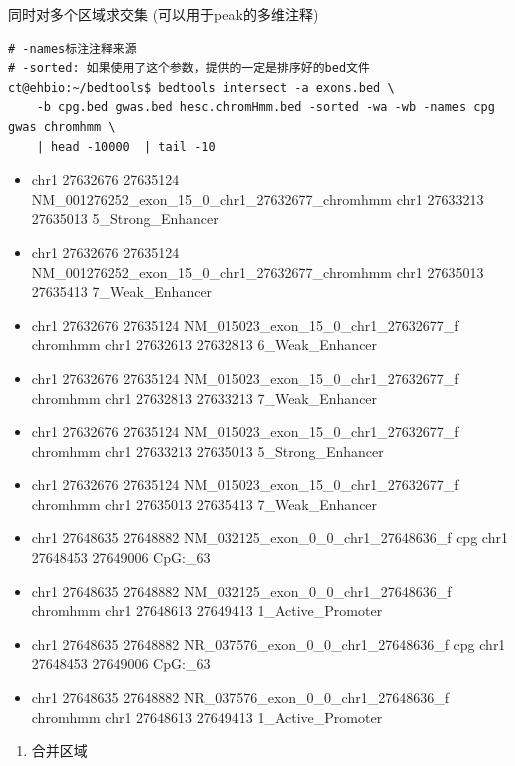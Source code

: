 \documentclass[]{article}
\providecommand{\tightlist}{%
  \setlength{\itemsep}{0pt}\setlength{\parskip}{0pt}}
\numberwithin{figure}{section}
\numberwithin{table}{section}
\begin{document}
同时对多个区域求交集 (可以用于peak的多维注释)

\begin{verbatim}
# -names标注注释来源
# -sorted: 如果使用了这个参数，提供的一定是排序好的bed文件
ct@ehbio:~/bedtools$ bedtools intersect -a exons.bed \
	-b cpg.bed gwas.bed hesc.chromHmm.bed -sorted -wa -wb -names cpg gwas chromhmm \
  	| head -10000  | tail -10
\end{verbatim}

\begin{itemize}
\tightlist
\item
  chr1 27632676 27635124 NM\_001276252\_exon\_15\_0\_chr1\_27632677\_chromhmm chr1 27633213 27635013 5\_Strong\_Enhancer
\item
  chr1 27632676 27635124 NM\_001276252\_exon\_15\_0\_chr1\_27632677\_chromhmm chr1 27635013 27635413 7\_Weak\_Enhancer
\item
  chr1 27632676 27635124 NM\_015023\_exon\_15\_0\_chr1\_27632677\_f chromhmm chr1 27632613 27632813 6\_Weak\_Enhancer
\item
  chr1 27632676 27635124 NM\_015023\_exon\_15\_0\_chr1\_27632677\_f chromhmm chr1 27632813 27633213 7\_Weak\_Enhancer
\item
  chr1 27632676 27635124 NM\_015023\_exon\_15\_0\_chr1\_27632677\_f chromhmm chr1 27633213 27635013 5\_Strong\_Enhancer
\item
  chr1 27632676 27635124 NM\_015023\_exon\_15\_0\_chr1\_27632677\_f chromhmm chr1 27635013 27635413 7\_Weak\_Enhancer
\item
  chr1 27648635 27648882 NM\_032125\_exon\_0\_0\_chr1\_27648636\_f cpg chr1 27648453 27649006 CpG:\_63
\item
  chr1 27648635 27648882 NM\_032125\_exon\_0\_0\_chr1\_27648636\_f chromhmm chr1 27648613 27649413 1\_Active\_Promoter
\item
  chr1 27648635 27648882 NR\_037576\_exon\_0\_0\_chr1\_27648636\_f cpg chr1 27648453 27649006 CpG:\_63
\item
  chr1 27648635 27648882 NR\_037576\_exon\_0\_0\_chr1\_27648636\_f chromhmm chr1 27648613 27649413 1\_Active\_Promoter
\end{itemize}

\begin{enumerate}
\def\labelenumi{\arabic{enumi}.}
\setcounter{enumi}{3}
\tightlist
\item
  合并区域
\end{enumerate}
\end{document}
